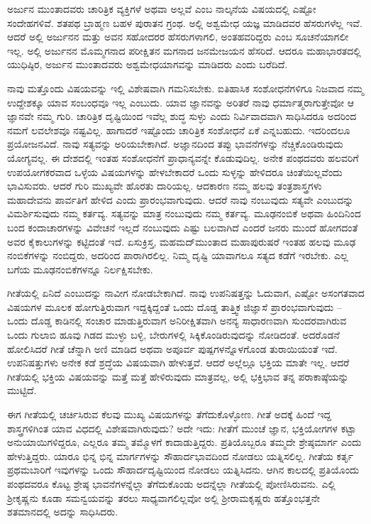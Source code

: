 ಅರ್ಜುನ ಮುಂತಾದವರು ಚಾರಿತ್ರಿಕ ವ್ಯಕ್ತಿಗಳೆ ಅಥವಾ ಅಲ್ಲವೆ ಎಂಬ ನಾಲ್ಕನೆಯ ವಿಷಯದಲ್ಲಿ ಎಷ್ಟೋ ಸಂದೇಹಗಳಿವೆ. ಶತಪಥ ಬ್ರಾಹ್ಮಣ ಬಹಳ ಪುರಾತನ ಗ್ರಂಥ. ಅಲ್ಲಿ ಅಶ್ವಮೇಧ ಯಜ್ಞ ಮಾಡಿದವರ ಹೆಸರುಗಳೆಲ್ಲ ಇವೆ. ಆದರೆ ಅಲ್ಲಿ ಅರ್ಜುನನ ಮತ್ತು ಅವನ ಸಹೋದರರ ಹೆಸರುಗಳಾಗಲಿ, ಅಂತಹವರಿದ್ದರು ಎಂಬ ಸೂಚನೆಯಾಗಲೀ ಇಲ್ಲ. ಅಲ್ಲಿ ಅರ್ಜುನನ ಮೊಮ್ಮಗನಾದ ಪರೀಕ್ಷಿತನ ಮಗನಾದ ಜನಮೇಜಯನ ಹೆಸರಿದೆ. ಆದರೂ ಮಹಾಭಾರತದಲ್ಲಿ ಯುಧಿಷ್ಠಿರ, ಅರ್ಜುನ ಮುಂತಾದವರು ಅಶ್ವಮೇಧಯಾಗವನ್ನು ಮಾಡಿದರು ಎಂದು ಬರೆದಿದೆ.

ನಾವು ಮತ್ತೊಂದು ವಿಷಯವನ್ನು ಇಲ್ಲಿ ವಿಶೇಷವಾಗಿ ಗಮನಿಸಬೇಕು. ಐತಿಹಾಸಿಕ ಸಂಶೋಧನೆಗಳಿಗೂ ನಿಜವಾದ ನಮ್ಮ ಉದ್ದೇಶಕ್ಕೂ ಯಾವ ಸಂಬಂಧವೂ ಇಲ್ಲ ಎಂಬುದು. ಯಾವ ಜ್ಞಾನವನ್ನು ಅರಿತರೆ ನಾವು ಧರ್ಮಾತ್ಮರಾಗುತ್ತೇವೋ ಆ ಜ್ಞಾನವೇ ನಮ್ಮ ಗುರಿ. ಚಾರಿತ್ರಿಕ ದೃಷ್ಟಿಯಿಂದ ಇವೆಲ್ಲ ಶುದ್ಧ ಸುಳ್ಳು ಎಂದು ನಿರ್ವಿವಾದವಾಗಿ ಸಾಧಿಸಿದರೂ ಅದರಿಂದ ನಮಗೆ ಲವಲೇಶವೂ ನಷ್ಟವಿಲ್ಲ. ಹಾಗಾದರೆ ಇಷ್ಟೊಂದು ಚಾರಿತ್ರಿಕ ಸಂಶೋಧನೆ ಏಕೆ ಎನ್ನಬಹುದು. ಇದರಿಂದಲೂ ಪ್ರಯೋಜನವಿದೆ. ನಾವು ಸತ್ಯವನ್ನು ಅರಿಯಬೇಕಾಗಿದೆ. ಅಜ್ಞಾನದಿಂದ ತಪ್ಪು ಭಾವನೆಗಳನ್ನು ನೆಚ್ಚಿಕೊಂಡಿರುವುದು ಯೋಗ್ಯವಲ್ಲ. ಈ ದೇಶದಲ್ಲಿ ಇಂತಹ ಸಂಶೋಧನೆಗೆ ಪ್ರಾಧಾನ್ಯವನ್ನೇ ಕೊಡುವುದಿಲ್ಲ. ಅನೇಕ ಪಂಥದವರು ಹಲವರಿಗೆ ಉಪಯೋಗಕರವಾದ ಒಳ್ಳೆಯ ವಿಷಯಗಳನ್ನು ಹೇಳಬೇಕಾದರೆ ಒಂದು ಸುಳ್ಳನ್ನು ಹೇಳಿದರೂ ಚಿಂತೆಯಿಲ್ಲವೆಂದು ಭಾವಿಸುವರು. ಆದರೆ ಗುರಿ ಮುಖ್ಯವೇ ಹೊರತು ದಾರಿಯಲ್ಲ. ಆದಕಾರಣ ನಮ್ಮ ಹಲವು ತಂತ್ರಶಾಸ್ತ್ರಗಳು ಮಹಾದೇವನು ಪಾರ್ವತಿಗೆ ಹೇಳಿದ ಎಂದು ಪ್ರಾರಂಭವಾಗುವುದು. ಆದರೆ ನಾವು ನಂಬುವುದು ಸತ್ಯವೇ ಎಂಬುದನ್ನು ವಿಮರ್ಶಿಸುವುದು ನಮ್ಮ ಕರ್ತವ್ಯ. ಸತ್ಯವನ್ನು ಮಾತ್ರ ನಂಬುವುದು ನಮ್ಮ ಕರ್ತವ್ಯ. ಮೂಢನಂಬಿಕೆ ಅಥವಾ ಹಿಂದಿನಿಂದ ಬಂದ ಕಂದಾಚಾರಗಳನ್ನು ವಿವೇಚನೆ ಇಲ್ಲದೆ ನಂಬುವುದು ಎಷ್ಟು ಬಲವಾಗಿದೆ ಎಂದರೆ ಜನರು ಮುಂದೆ ಹೋಗದಂತೆ ಅವರ ಕೈಕಾಲುಗಳನ್ನು ಕಟ್ಟಿದಂತೆ ಇದೆ. ಏಸುಕ್ರಿಸ್ತ, ಮಹಮದ್​ ಮುಂತಾದ ಮಹಾಪುರುಷರೆ ಇಂತಹ ಹಲವು ಮೂಢ ನಂಬಿಕೆ\-ಗಳನ್ನು ನಂಬಿದ್ದರು, ಅದರಿಂದ ಪಾರಾಗಿರಲಿಲ್ಲ. ನಿಮ್ಮ ದೃಷ್ಟಿ ಯಾವಾಗಲೂ ಸತ್ಯದ ಕಡೆಗೆ ಇರಬೇಕು. ಎಲ್ಲ ಬಗೆಯ ಮೂಢನಂಬಿಕೆಗಳನ್ನೂ ನಿರ್ಲಕ್ಷಿಸಬೇಕು.

ಗೀತೆಯಲ್ಲಿ ಏನಿದೆ ಎಂಬುದನ್ನು ನಾವೀಗ ನೋಡಬೇಕಾಗಿದೆ. ನಾವು ಉಪನಿಷತ್ತನ್ನು ಓದುವಾಗ, ಎಷ್ಟೋ ಅಸಂಗತವಾದ ವಿಷಯಗಳ ಮೂಲಕ ಹೋಗುತ್ತಿರುವಾಗ ಇದ್ದಕ್ಕಿದ್ದಂತೆ ಒಂದು ದೊಡ್ಡ ತಾತ್ತ್ವಿಕ ಜಿಜ್ಞಾಸೆ ಪ್ರಾರಂಭವಾಗುವುದು – ಒಂದು ದೊಡ್ಡ ಕಾಡಿನಲ್ಲಿ ಸಂಚಾರ ಮಾಡುತ್ತಿರುವಾಗ ಅನಿರೀಕ್ಷಿತವಾಗಿ ಅನನ್ಯ ಸಾಧಾರಣವಾಗಿ ಸುಂದರವಾಗಿರುವ ಒಂದು ಗುಲಾಬಿ ಹೂವು ಗಿಡದ ಮುಳ್ಳು ಬಳ್ಳಿ, ಬೇರುಗಳಲ್ಲಿ ಸಿಕ್ಕಿಕೊಂಡಿರುವುದನ್ನು ನೋಡಿದಂತೆ. ಅದರೊಡನೆ ಹೋಲಿಸಿದರೆ ಗೀತೆ ಚೆನ್ನಾಗಿ ಅಣಿ ಮಾಡಿದ ಅಥವಾ ಅಪೂರ್ವ ಪುಷ್ಪಗಳನ್ನೊಳಗೊಂಡ ತುರಾಯಿಯಂತೆ ಇದೆ. ಉಪನಿಷತ್ತುಗಳು ಅನೇಕ ಕಡೆ ಶ್ರದ್ಧೆಯ ವಿಷಯವಾಗಿ ಹೇಳುತ್ತವೆ. ಆದರೆ ಅಲ್ಲೆಲ್ಲೂ ಭಕ್ತಿಯ ಮಾತೇ ಇಲ್ಲ. ಆದರೆ ಗೀತೆಯಲ್ಲಿ ಭಕ್ತಿಯ ವಿಷಯವನ್ನು ಮತ್ತೆ ಮತ್ತೆ ಹೇಳಿರುವುದು ಮಾತ್ರವಲ್ಲ, ಅಲ್ಲಿ ಭಕ್ತಿಭಾವ ತನ್ನ ಪರಾಕಾಷ್ಠೆಯನ್ನು ಮುಟ್ಟಿದೆ.

ಈಗ ಗೀತೆಯಲ್ಲಿ ಚರ್ಚಿಸಿರುವ ಕೆಲವು ಮುಖ್ಯ ವಿಷಯಗಳನ್ನು ತೆಗೆದುಕೊಳ್ಳೋಣ. ಗೀತೆ ಅದಕ್ಕೆ ಹಿಂದೆ ಇದ್ದ ಶಾಸ್ತ್ರಗಳಿಗಿಂತ ಯಾವ ವಿಧದಲ್ಲಿ ವಿಶೇಷವಾಗಿರುವುದು? ಅದೇ ಇದು: ಗೀತೆಗೆ ಮುಂಚೆ ಜ್ಞಾನ, ಭಕ್ತಿಯೋಗಗಳ ಕಟ್ಟಾ ಅನುಯಾಯಿಗಳಿದ್ದರೂ, ಎಲ್ಲರೂ ತಮ್ಮ ತಮ್ಮೊಳಗೆ ಕಾದಾಡುತ್ತಿದ್ದರು. ಪ್ರತಿಯೊಬ್ಬರೂ ತಮ್ಮದೇ ಶ್ರೇಷ್ಠಮಾರ್ಗ ಎಂದು ಹೇಳುತ್ತಿದ್ದರು. ಯಾರೂ ಭಿನ್ನ ಭಿನ್ನ ಮಾರ್ಗಗಳನ್ನು ಸೌಹಾರ್ದಭಾವದಿಂದ ನೋಡಲು ಯತ್ನಿಸಲಿಲ್ಲ. ಗೀತೆಯ ಕರ್ತೃ ಪ್ರಥಮಬಾರಿಗೆ ಇವುಗಳನ್ನು ಒಂದು ಸೌಹಾರ್ದದೃಷ್ಟಿಯಿಂದ ನೋಡಲು ಯತ್ನಿಸಿದನು. ಆಗಿನ ಕಾಲದಲ್ಲಿ ಪ್ರತಿಯೊಂದು ಪಂಥದವರೂ ಕೊಟ್ಟ ಶ್ರೇಷ್ಠ ಭಾವನೆಗಳನ್ನೆಲ್ಲಾ ತೆಗೆದುಕೊಂಡು ಅದನ್ನೆಲ್ಲಾ ಗೀತೆಯಲ್ಲಿ ಪೋಣಿ\-ಸಿರುವನು. ಎಲ್ಲಿ ಶ‍್ರೀಕೃಷ್ಣನು ಕೂಡಾ ಸಮನ್ವಯವನ್ನು ತರಲು ಸಾಧ್ಯವಾಗಲಿಲ್ಲವೋ ಅಲ್ಲಿ ಶ‍್ರೀರಾಮಕೃಷ್ಣರು ಹತ್ತೊಂಭತ್ತನೇ ಶತಮಾನದಲ್ಲಿ ಅದನ್ನು ಸಾಧಿಸಿದರು.

